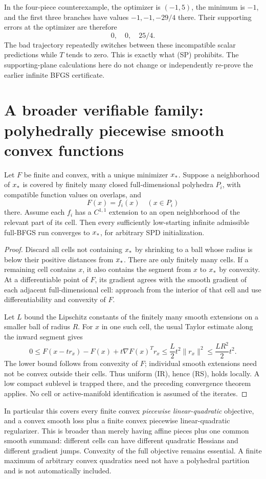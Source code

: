 In the four-piece counterexample, the optimizer is $(-1,5)$, the minimum is $-1$, and the first three branches have values $-1,-1,-29/4$ there. Their supporting errors at the optimizer are therefore
\[
 0,\quad0,\quad25/4.
\]
The bad trajectory repeatedly switches between these incompatible scalar predictions while $T$ tends to zero. This is exactly what (SP) prohibits. The supporting-plane calculations here do not change or independently re-prove the earlier infinite BFGS certificate.


\setcounter{section}{4}
\setcounter{theorem}{0}
\setcounter{equation}{8}
\section{A broader verifiable family: polyhedrally piecewise smooth convex functions}
\begin{theorem}\label{R:thm:plq}
Let $F$ be finite and convex, with a unique minimizer $x_*$. Suppose a neighborhood of $x_*$ is covered by finitely many closed full-dimensional polyhedra $P_i$, with compatible function values on overlaps, and
\[
 F(x)=f_i(x)\quad(x\in P_i)
\]
there. Assume each $f_i$ has a $C^{1,1}$ extension to an open neighborhood of the relevant part of its cell. Then every sufficiently low-starting infinite admissible full-BFGS run converges to $x_*$, for arbitrary SPD initialization.
\end{theorem}
\begin{proof}
Discard all cells not containing $x_*$ by shrinking to a ball whose radius is below their positive distances from $x_*$. There are only finitely many cells. If a remaining cell contains $x$, it also contains the segment from $x$ to $x_*$ by convexity. At a differentiable point of $F$, its gradient agrees with the smooth gradient of each adjacent full-dimensional cell: approach from the interior of that cell and use differentiability and convexity of $F$.

Let $L$ bound the Lipschitz constants of the finitely many smooth extensions on a smaller ball of radius $R$. For $x$ in one such cell, the usual Taylor estimate along the inward segment gives
\[
 0\le F(x-t r_x)-F(x)+t\nabla F(x)^Tr_x
 \le\frac L2 t^2\|r_x\|^2\le\frac{LR^2}{2}t^2.
\]
The lower bound follows from convexity of $F$; individual smooth extensions need not be convex outside their cells. Thus uniform (IR), hence (RS), holds locally. A low compact sublevel is trapped there, and the preceding convergence theorem applies. No cell or active-manifold identification is assumed of the iterates.
\end{proof}
In particular this covers every finite convex \emph{piecewise linear-quadratic} objective, and a convex smooth loss plus a finite convex piecewise linear-quadratic regularizer. This is broader than merely having affine pieces plus one common smooth summand: different cells can have different quadratic Hessians and different gradient jumps. Convexity of the full objective remains essential. A finite maximum of arbitrary convex quadratics need not have a polyhedral partition and is not automatically included.


